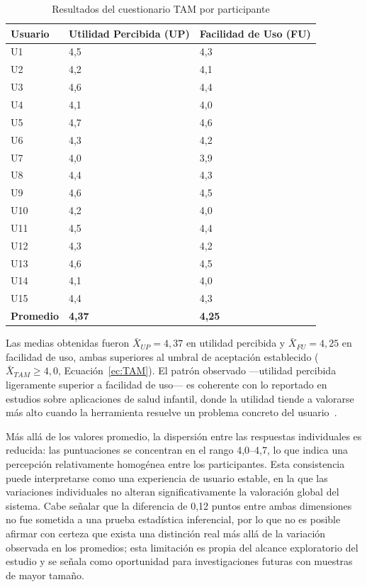 				\begin{table}[H]
					\centering\small
					\caption{Resultados del cuestionario TAM por participante}
					\label{tab:tam}
					\begin{tabular}{p{4cm}p{4.5cm}p{4.5cm}}
						\hline
						\textbf{Usuario} & \textbf{Utilidad Percibida (UP)} & \textbf{Facilidad de Uso (FU)}\\
						\hline
						U1 & 4,5 & 4,3\\
						U2 & 4,2 & 4,1\\
						U3 & 4,6 & 4,4\\
						U4 & 4,1 & 4,0\\
						U5 & 4,7 & 4,6\\
						U6 & 4,3 & 4,2\\
						U7 & 4,0 & 3,9\\
						U8 & 4,4 & 4,3\\
						U9 & 4,6 & 4,5\\
						U10 & 4,2 & 4,0\\
						U11 & 4,5 & 4,4\\
						U12 & 4,3 & 4,2\\
						U13 & 4,6 & 4,5\\
						U14 & 4,1 & 4,0\\
						U15 & 4,4 & 4,3\\
						\textbf{Promedio} & \textbf{4,37} & \textbf{4,25}\\
						\hline
					\end{tabular}
				\end{table}
				\tblnote
				
				Las medias obtenidas fueron $\bar{X}_{UP} = 4{,}37$ en utilidad percibida y $\bar{X}_{FU} = 4{,}25$ en facilidad de uso, ambas superiores al umbral de aceptación establecido ($\bar{X}_{TAM} \geq 4{,}0$, Ecuación~\eqref{ec:TAM}). El patrón observado ---utilidad percibida ligeramente superior a facilidad de uso--- es coherente con lo reportado en estudios sobre aplicaciones de salud infantil, donde la utilidad tiende a valorarse más alto cuando la herramienta resuelve un problema concreto del usuario~\cite{Venkatesh2003,Domin2022}.
				
				Más allá de los valores promedio, la dispersión entre las respuestas individuales es reducida: las puntuaciones se concentran en el rango 4,0--4,7, lo que indica una percepción relativamente homogénea entre los participantes. Esta consistencia puede interpretarse como una experiencia de usuario estable, en la que las variaciones individuales no alteran significativamente la valoración global del sistema. Cabe señalar que la diferencia de 0,12 puntos entre ambas dimensiones no fue sometida a una prueba estadística inferencial, por lo que no es posible afirmar con certeza que exista una distinción real más allá de la variación observada en los promedios; esta limitación es propia del alcance exploratorio del estudio y se señala como oportunidad para investigaciones futuras con muestras de mayor tamaño.
				
